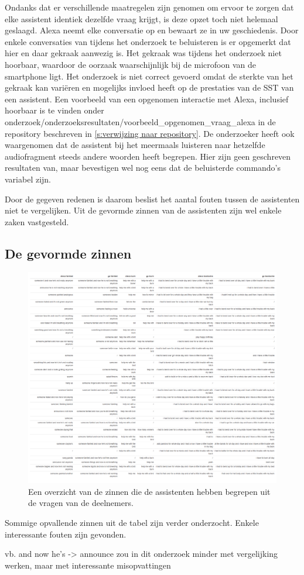 Ondanks dat er verschillende maatregelen zijn genomen om ervoor te zorgen dat elke assistent identiek dezelfde vraag krijgt, is deze opzet toch niet helemaal geslaagd. Alexa neemt elke conversatie op en bewaart ze in uw geschiedenis. Door enkele conversaties van tijdens het onderzoek te beluisteren is er opgemerkt dat hier en daar gekraak aanwezig is. Het gekraak was tijdens het onderzoek niet hoorbaar, waardoor de oorzaak waarschijnlijk bij de microfoon van de smartphone ligt. Het onderzoek is niet correct gevoerd omdat de sterkte van het gekraak kan variëren en mogelijks invloed heeft op de prestaties van de SST van een assistent. Een voorbeeld van een opgenomen interactie met Alexa, inclusief hoorbaar is te vinden onder onderzoek/onderzoeksresultaten/voorbeeld\_opgenomen\_vraag\_alexa in de repository beschreven in \ref{s:verwijzing naar repository}.
De onderzoeker heeft ook waargenomen dat de assistent bij het meermaals luisteren naar hetzelfde audiofragment steeds andere woorden heeft begrepen. Hier zijn geen geschreven resultaten van, maar bevestigen wel nog eens dat de beluisterde commando's variabel zijn.

Door de gegeven redenen is daarom beslist het aantal fouten tussen de assistenten niet te vergelijken. Uit de gevormde zinnen van de assistenten zijn wel enkele zaken vastgesteld.

\subsection{De gevormde zinnen}
\begin{figure}[h]
    \includegraphics[width=1\linewidth]{../onderzoek/onderzoeksresultaten/vergelijking_tts_alle_teksten/tabel_alle_teksten}
    \caption{Een overzicht van de zinnen die de assistenten hebben begrepen uit de vragen van de deelnemers.}
    \label{fig:tabel-alle-teksten}
\end{figure}

Sommige opvallende zinnen uit de tabel zijn verder onderzocht. Enkele interessante fouten zijn gevonden.



 vb. and now he's -> announce
zou in dit onderzoek minder met vergelijking werken, maar met interessante misopvattingen


